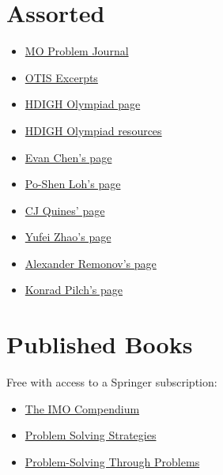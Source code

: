 \section{Assorted}
\begin{itemize}
    \item
        \href{https://github.com/AnglyPascal/MO-Problem-Journal/releases/download/v1.0/MO_Problem_Journal.pdf}{MO
        Problem Journal}
  \item \href{https://web.evanchen.cc/textbooks/OTIS-Excerpts.pdf}{OTIS
      Excerpts}
  \item
    \href{https://web.archive.org/web/20220102030159/https://how-did-i-get-here.com/olympiad/}{HDIGH Olympiad page}
  \item
    \href{https://web.archive.org/web/20220102030357/https://how-did-i-get-here.com/olympiad-resources/}{HDIGH Olympiad
      resources}
  \item \href{https://web.evanchen.cc/olympiad.html}{Evan Chen's page}
  \item \href{https://www.math.cmu.edu/~ploh/olympiad.shtml}{Po-Shen Loh's page}
  \item \href{https://cjquines.com/math/competition-handouts}{CJ Quines' page}
  \item \href{https://yufeizhao.com/olympiad/}{Yufei Zhao's page}
  \item \href{https://alexanderrem.weebly.com/math-competitions.html}{Alexander
      Remonov's page}
  \item \href{https://www.its.caltech.edu/~kpilch/olympiad.html}{Konrad Pilch's
      page}
\end{itemize}
\section{Published Books}
Free with access to a Springer subscription:
\begin{itemize}
    \item \href{https://link.springer.com/book/10.1007/978-1-4419-9854-5}{The
        IMO Compendium}
    \item \href{https://link.springer.com/book/10.1007/b97682}{Problem Solving
        Strategies}
    \item
        \href{https://link.springer.com/book/10.1007/978-1-4612-5498-0}{Problem-Solving
        Through Problems}
\end{itemize}
